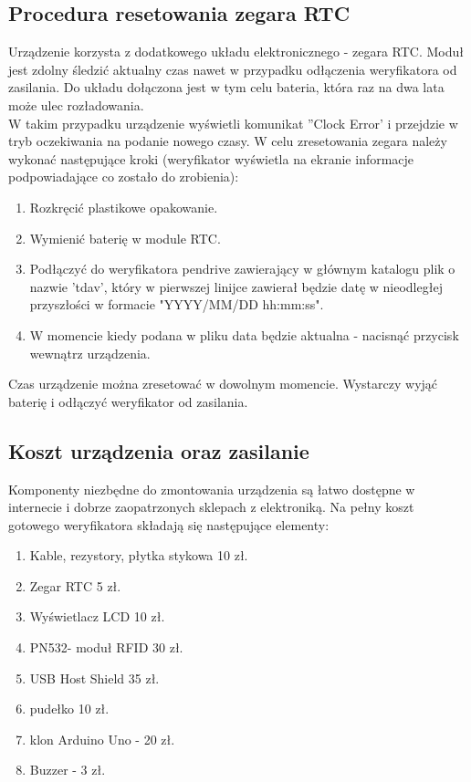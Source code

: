 \documentclass[declaration,shortabstract, mgr]{iithesis}
\begin{document}
\subsection{Procedura resetowania zegara RTC}
\indent Urządzenie korzysta z dodatkowego układu elektronicznego - zegara RTC. Moduł jest zdolny śledzić aktualny czas nawet w przypadku odłączenia weryfikatora od zasilania. Do układu dołączona jest w tym celu bateria, która raz na dwa lata może ulec rozładowania.\\
\indent W takim przypadku urządzenie wyświetli komunikat ''Clock Error' i przejdzie w tryb oczekiwania na podanie nowego czasy. W celu zresetowania zegara należy wykonać następujące kroki (weryfikator wyświetla na ekranie informacje podpowiadające co zostało do zrobienia):
\begin{enumerate}
\item Rozkręcić plastikowe opakowanie.
\item Wymienić baterię w module RTC.
\item Podłączyć do weryfikatora pendrive zawierający w głównym katalogu plik o nazwie 'tdav', który w pierwszej linijce zawierał będzie datę w nieodległej przyszłości w formacie "YYYY/MM/DD hh:mm:ss".
\item W momencie kiedy podana w pliku data będzie aktualna - nacisnąć przycisk wewnątrz urządzenia.
\end{enumerate}
\indent Czas urządzenie można zresetować w dowolnym momencie. Wystarczy wyjąć baterię i odłączyć weryfikator od zasilania.
\subsection{Koszt urządzenia oraz zasilanie}
\indent Komponenty niezbędne do zmontowania urządzenia są łatwo dostępne w internecie i dobrze zaopatrzonych sklepach z elektroniką. Na pełny koszt gotowego weryfikatora składają się następujące elementy:
\begin{enumerate}
\item Kable, rezystory, płytka stykowa 10 zł.
\item Zegar RTC 5 zł.
\item Wyświetlacz LCD 10 zł.
\item PN532- moduł RFID 30 zł.
\item USB Host Shield 35 zł.
\item pudełko 10 zł.
\item klon Arduino Uno - 20 zł.
\item Buzzer - 3 zł.
\end{enumerate}
\end{document}
